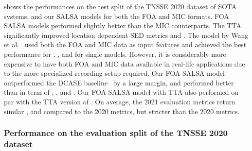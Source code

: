 \documentclass[journal]{IEEEtran}
\newcommand{\etalcite}[1]{ et al.~\cite{#1}}
\newcommand{\ER}{\xspace}
\newcommand{\Fone}{\xspace}
\newcommand{\LE}{\xspace}
\newcommand{\LR}{\xspace}
\begin{document}
 shows the performances on the test split of the TNSSE 2020 dataset of SOTA systems, and our SALSA models for both the FOA and MIC formats. FOA SALSA models performed slightly better than the MIC counterparts. The TTA significantly improved location dependent SED metrics \ER and \Fone. The model by Wang\etalcite{Wang2020TheChallenge} used both the FOA and MIC data as input features and achieved the best performance for \ER, \Fone, and \LR for single models. However, it is considerably more expensive to have both FOA and MIC data available in real-life applications due to the more specialized recording setup required. Our FOA SALSA model outperformed the DCASE baseline~\cite{Politis2020ADetection} by a large margin, and performed better than \cite{Shimada2021ACCDOA:Detection} in term of \ER, \Fone, and \LE. Our FOA SALSA model with TTA also performed on-par with the TTA version of \cite{Shimada2021ACCDOA:Detection}. On average, the 2021 evaluation metrics return similar \ER, \Fone and \LE compared to the 2020 metrics, but stricter \LR than the 2020 metrics. 

\subsubsection{Performance on the evaluation split of the TNSSE 2020 dataset}
\end{document}
